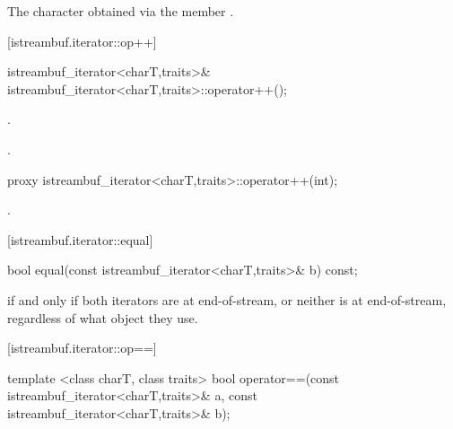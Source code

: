 \begin{itemdescr}
\pnum
\returns
The character obtained via the
member
.
\end{itemdescr}

[istreambuf.iterator::op++]{}

%
\begin{itemdecl}
istreambuf_iterator<charT,traits>&
    istreambuf_iterator<charT,traits>::operator++();
\end{itemdecl}

\begin{itemdescr}
\pnum
\effects
{}.

\pnum
\returns
{}.
\end{itemdescr}

%
%
\begin{itemdecl}
proxy istreambuf_iterator<charT,traits>::operator++(int);
\end{itemdecl}

\begin{itemdescr}
\pnum
\returns
{}.
\end{itemdescr}

[istreambuf.iterator::equal]{}

%
\begin{itemdecl}
bool equal(const istreambuf_iterator<charT,traits>& b) const;
\end{itemdecl}

\begin{itemdescr}
\pnum
\returns
{}
if and only if both iterators are at end-of-stream,
or neither is at end-of-stream, regardless of what
object they use.
\end{itemdescr}

[istreambuf.iterator::op==]{}

%
\begin{itemdecl}
template <class charT, class traits>
  bool operator==(const istreambuf_iterator<charT,traits>& a,
                  const istreambuf_iterator<charT,traits>& b);
\end{itemdecl}

